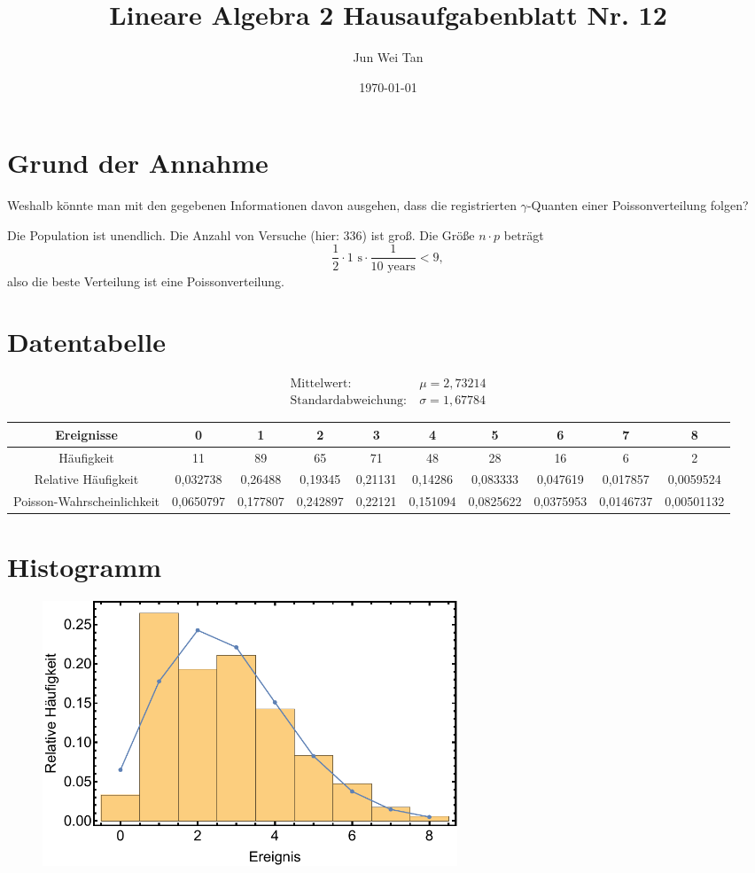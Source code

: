 \documentclass[prb,12pt]{revtex4-2}
\theoremstyle{definition}
\theoremstyle{definition}
\begin{document}
	\title{Lineare Algebra 2 Hausaufgabenblatt Nr. 12}
	\author{Jun Wei Tan}
	\date{\today}
	\maketitle

\section{Grund der Annahme}
\begin{tcolorbox}
	Weshalb könnte man mit den gegebenen Informationen davon ausgehen, dass die registrierten $\gamma$-Quanten einer Poissonverteilung folgen?
\end{tcolorbox}
Die Population ist unendlich. Die Anzahl von Versuche (hier: 336) ist groß. Die Größe $n\cdot p$ beträgt
\[\frac 12 \cdot 1\text{ s}\cdot \frac{1}{10\text{ years}}<9,\]
also die beste Verteilung ist eine Poissonverteilung.
\section{Datentabelle}
\begin{align*}
	\text{Mittelwert}:&~\mu=2,73214\\
	\text{Standardabweichung}:&~\sigma=1,67784
\end{align*}
\begin{table}[h]
	{\scriptsize
\begin{tabular}{cccccccccc}
	\toprule
	\textbf{Ereignisse} & 0 & 1 & 2 & 3 & 4 & 5 & 6 & 7 & 8 \\\midrule
	H\"{a}ufigkeit & 11 & 89 & 65 & 71 & 48 & 28 & 16 & 6 & 2 \\\midrule
	Relative H\"{a}ufigkeit & 0,032738 & 0,26488 & 0,19345 & 0,21131 & 0,14286 & 0,083333 & 0,047619 & 0,017857 & 0,0059524 \\\midrule
	Poisson-Wahrscheinlichkeit & 0,0650797 & 0,177807 & 0,242897 & 0,22121 & 0,151094 & 0,0825622 & 0,0375953 & 0,0146737 & 0,00501132 \\\bottomrule
\end{tabular}
}
\end{table}

\section{Histogramm}
\begin{figure}[h]
	\includegraphics[width=0.6\textwidth]{fig1.pdf}
	\caption{}
\end{figure}
\end{document}
